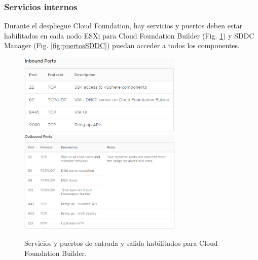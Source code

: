 \subsubsection{Servicios internos}
\label{subsubsec:servInterno}
Durante el despliegue Cloud Foundation, hay servicios y puertos deben estar habilitados en cada nodo ESXi para Cloud Foundation Builder (Fig. \ref{fig:puertosCB}) y SDDC Manager (Fig. \ref{fig:puertosSDDC}) puedan acceder a todos los componentes.

\begin{figure}[h!]
  \centering
  \includegraphics[width=0.7\textwidth]{imaxes/conceptosPrevios/puertosentradaCB.png}
  \includegraphics[width=0.7\textwidth]{imaxes/conceptosPrevios/puertossalidaCB.png}
  \caption{Servicios y puertos de entrada y salida habilitados para Cloud Foundation Builder.}
  \label{fig:puertosCB}
\end{figure}

